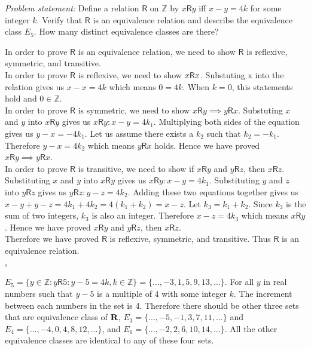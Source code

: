 \documentclass{article}
\begin{document}
	
	{\it Problem statement:}  Define a relation $\mathsf{R}$ on $\mathbb{Z}$ by $x \mathsf{R} y$ iff $x-y = 4k$ for some integer $k$.  Verify that $\mathsf{R}$ is an equivalence relation and describe the equivalence class $E_5$.  How many distinct equivalence classes are there? \\
	
	\vspace{.15in}

	 In order to prove $\mathsf{R}$ is an equivalence relation, we need to show $\mathsf{R}$ is reflexive, symmetric, and transitive.\\
	
	In order to prove $\mathsf{R}$ is reflexive, we need to show $x \text{\bf $\mathsf{R}$} x$. Substuting x into the relation gives us $x - x = 4k$ which means $0 = 4k$. When $k = 0$, this statements hold and $0 \in \mathbb{Z}$.\\
	
	In order to prove $\mathsf{R}$ is symmetric, we need to show $x \mathsf{R} y \implies y \mathsf{R} x$. Substuting $x$ and $y$ into $x \mathsf{R} y$ gives us $x \mathsf{R} y: x - y = 4k_{1}$. Multiplying both sides of the equation gives us $y-x=-4k_1$. Let us assume there exists a $k_2$ such that $k_2 = - k_1$. Therefore $y - x = 4k_2$ which means $y \mathsf{R} x$ holds. Hence we have proved  $x \mathsf{R} y \implies y \mathsf{R} x$.\\
	
	In order to prove $\mathsf{R}$ is transitive, we need to show if $x \mathsf{R} y$ and $y \mathsf{R} z$, then $x \mathsf{R} z$. Substituting $x$ and $y$ into $x \mathsf{R} y$ gives us $x \mathsf{R} y: x - y = 4k_1$. Substituting $y$ and $z$ into $y \mathsf{R} z$ gives us $y \mathsf{R} z: y - z = 4k_2$. Adding these two equations together gives us $x-y+y-z = 4k_1 + 4k_2 = 4(k_1 + k_2) = x-z$. Let $k_3 = k_1 + k_2$. Since $k_3$ is the sum of two integers, $k_3$ is also an integer. Therefore $x - z = 4k_3$ which means $x \mathsf{R} y$. Hence we have proved  $x \mathsf{R} y$ and $y \mathsf{R} z$, then $x \mathsf{R} z$.\\
	
	Therefore we have proved $\mathsf{R}$ is reflexive, symmetric, and transitive. Thus $\mathsf{R}$ is an equivalence relation.\\
	
	\begin{flushright}
		$\square$
	\end{flushright}
	
	$E_{5} = \{y \in \mathbb{Z}: y \mathsf{R} 5: y - 5 = 4k , k \in \mathbb{Z} \} = \{...,-3, 1, 5, 9, 13,...\}$. For all $y$ in real numbers such that $y - 5$ is a multiple of $4$ with some integer $k$. The increment between each numbers in the set is 4. Therefore there should be other three sets that are equivalence class of $\text{\bf R}$, $E_3 = \{...,-5,-1,3,7,11,...\}$ and $E_4=\{...,-4,0,4,8,12,...\}$, and $E_6 = \{...,-2,2,6,10,14,...\}$. All the other equivalence classes are identical to any of these four sets.
	
\end{document}
